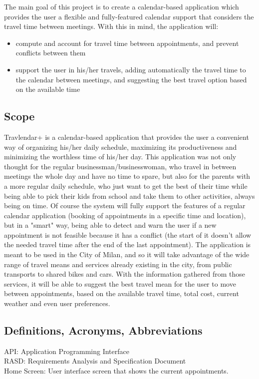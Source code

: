 \documentclass[12pt]{article}
\begin{document}
The main goal of this project is to create a calendar-based application which provides the user a flexible and fully-featured calendar support that considers the travel time between meetings. With this in mind, the application will:
\begin{itemize}
\item compute and account for travel time between appointments, and prevent conflicts between them
\item support the user in his/her travels, adding automatically the travel time to the calendar between meetings, and suggesting the best travel option based on the available time
\end{itemize}

\subsection{Scope}
Travlendar+ is a calendar-based application that provides the user a convenient way of organizing his/her daily schedule, maximizing its productiveness and minimizing the worthless time of his/her day. This application was not only thought for the regular businessman/businesswoman, who travel in between meetings the whole day and have no time to spare, but also for the parents with a more regular daily schedule, who just want to get the best of their time while being able to pick their kids from school and take them to other activities, always being on time.
Of course the system will fully support the features of a regular calendar application (booking of appointments in a specific time and location), but in a "smart" way, being able to detect and warn the user if a new appointment is not feasible because it has a conflict (the start of it doesn't allow the needed travel time after the end of the last appointment). The application is meant to be used in the City of Milan, and so it will take advantage of the wide range of travel means and services already existing in the city, from public transports to shared bikes and cars. With the information gathered from those services, it will be able to suggest the best travel mean for the user to move between appointments, based on the available travel time, total cost, current weather and even user preferences.


\subsection{Definitions, Acronyms, Abbreviations}
API: Application Programming Interface\\
RASD: Requirements Analysis and Specification Document\\
Home Screen: User interface screen that shows the current appointments.
\end{document}
